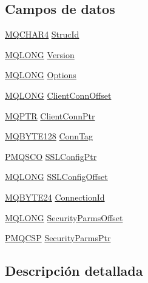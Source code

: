 \subsection*{Campos de datos}
\begin{DoxyCompactItemize}
\item 
\hyperlink{cmqc_8h_a12590e546ed66fda7cf21c1d5cefa31d}{M\+Q\+C\+H\+A\+R4} \hyperlink{structtag_m_q_c_n_o_a0530922ca944569b52601d74941f96e4}{Struc\+Id}
\item 
\hyperlink{cmqc_8h_a1fb8d28cbda3fa8766a9821230cdb6d5}{M\+Q\+L\+O\+N\+G} \hyperlink{structtag_m_q_c_n_o_a0656ef8f766b3907d394d88a35d7b7e9}{Version}
\item 
\hyperlink{cmqc_8h_a1fb8d28cbda3fa8766a9821230cdb6d5}{M\+Q\+L\+O\+N\+G} \hyperlink{structtag_m_q_c_n_o_ad7aff2d6c6044809464380998d24ec5c}{Options}
\item 
\hyperlink{cmqc_8h_a1fb8d28cbda3fa8766a9821230cdb6d5}{M\+Q\+L\+O\+N\+G} \hyperlink{structtag_m_q_c_n_o_ab4e4fcacd66e164d2a244ebcb25fbb7c}{Client\+Conn\+Offset}
\item 
\hyperlink{cmqc_8h_a0b835d8e479d7c42242ed9c6b6572f5a}{M\+Q\+P\+T\+R} \hyperlink{structtag_m_q_c_n_o_a9e3caa54a09c6a065efeddfcb08449b3}{Client\+Conn\+Ptr}
\item 
\hyperlink{cmqc_8h_a116dfa79a3458b30fd6d5d0cc5da63cf}{M\+Q\+B\+Y\+T\+E128} \hyperlink{structtag_m_q_c_n_o_a5beb55e47cd784cb266d9744248886b5}{Conn\+Tag}
\item 
\hyperlink{cmqc_8h_ab266373c2d71646ed164310df16916c8}{P\+M\+Q\+S\+C\+O} \hyperlink{structtag_m_q_c_n_o_afd1588e665b4f8b035009e2a8ecec3cd}{S\+S\+L\+Config\+Ptr}
\item 
\hyperlink{cmqc_8h_a1fb8d28cbda3fa8766a9821230cdb6d5}{M\+Q\+L\+O\+N\+G} \hyperlink{structtag_m_q_c_n_o_a20bd6e5f8cb1b77946a9cdbd77e3eb03}{S\+S\+L\+Config\+Offset}
\item 
\hyperlink{cmqc_8h_a2866d93c0ef84cfcda34cab5fd22fc5a}{M\+Q\+B\+Y\+T\+E24} \hyperlink{structtag_m_q_c_n_o_a82a7b183d6b1a0a9f423a5194cef7577}{Connection\+Id}
\item 
\hyperlink{cmqc_8h_a1fb8d28cbda3fa8766a9821230cdb6d5}{M\+Q\+L\+O\+N\+G} \hyperlink{structtag_m_q_c_n_o_aa27268ebe318b338a6560bc161f973a1}{Security\+Parms\+Offset}
\item 
\hyperlink{cmqc_8h_ad9def548668b8b75e902d3729221bc94}{P\+M\+Q\+C\+S\+P} \hyperlink{structtag_m_q_c_n_o_a05cf93aa50d81a5d3f54afd5f2e0a35d}{Security\+Parms\+Ptr}
\end{DoxyCompactItemize}


\subsection{Descripción detallada}


